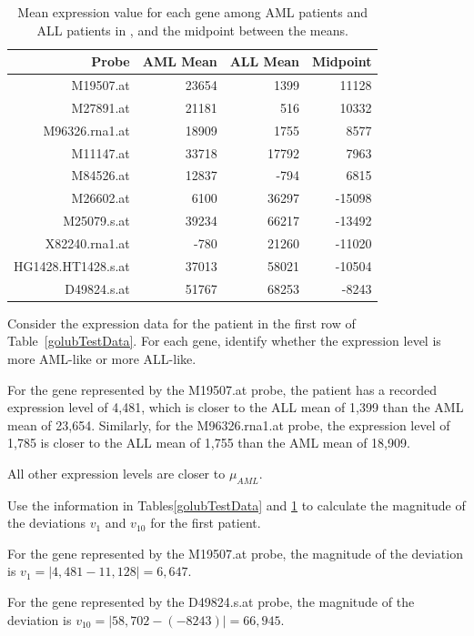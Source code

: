 \begin{table}[ht]
	\centering
	\footnotesize
	\begin{tabular}{r|r|r|r}
		\hline
		Probe & AML Mean & ALL Mean & Midpoint \\ 
		\hline
		M19507.at & 23654 & 1399 & 11128 \\ 
		M27891.at & 21181 & 516 & 10332 \\ 
		M96326.rna1.at & 18909 & 1755 & 8577 \\ 
		M11147.at & 33718 & 17792 & 7963 \\ 
		M84526.at & 12837 & -794 & 6815 \\ 
		M26602.at & 6100 & 36297 & -15098 \\ 
		M25079.s.at & 39234 & 66217 & -13492 \\ 
		X82240.rna1.at & -780 & 21260 & -11020 \\ 
		HG1428.HT1428.s.at & 37013 & 58021 & -10504 \\ 
		D49824.s.at & 51767 & 68253 & -8243 \\ 
		\hline
	\end{tabular}
		\caption{Mean expression value for each gene among AML patients and ALL patients in , and the midpoint between the means. \label{golubTrainMeansMidpoints}}
		
\end{table}	

\begin{example}{Consider the expression data for the patient in the first row of Table~\ref{golubTestData}. For each gene, identify whether the expression level is more AML-like or more ALL-like.}
	
For the gene represented by the M19507.at probe, the patient has a recorded expression level of 4,481, which is closer to the ALL mean of 1,399 than the AML mean of 23,654. Similarly, for the M96326.rna1.at probe, the expression level of 1,785 is closer to the ALL mean of 1,755 than the AML mean of 18,909. 

All other expression levels are closer to $\mu_{AML}$.
	
\end{example}

\begin{example}{Use the information in Tables\ref{golubTestData} and \ref{golubTrainMeansMidpoints} to calculate the magnitude of the deviations $v_1$ and $v_{10}$ for the first patient.}
	
For the gene represented by the M19507.at probe, the magnitude of the deviation is $v_1 = |4,481 - 11,128| = 6,647$.	

For the gene represented by the D49824.s.at probe, the magnitude of the deviation is $v_{10} = | 58,702 - (-8243)| = 66,945$.
	
\end{example}	

